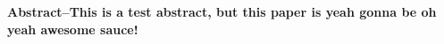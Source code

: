\begin{center}{\bfseries
Abstract--This is a test abstract, but this paper is yeah gonna be oh yeah awesome sauce!
}
\end{center}
